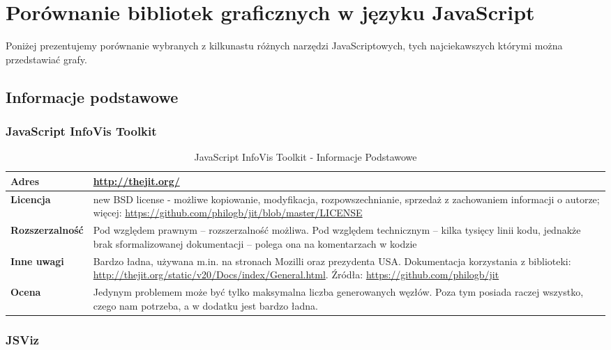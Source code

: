 \chapter{Porównanie bibliotek graficznych w języku JavaScript}
Poniżej prezentujemy porównanie wybranych z kilkunastu różnych narzędzi JavaScriptowych, tych najciekawszych którymi można przedstawiać grafy.

\section{Informacje podstawowe}
\subsection{JavaScript InfoVis Toolkit}

\begin{table}[!htbp]
\begin{tabularx}{\textwidth}{ ||l|R|| }
\hline
\textbf{Adres} & \url{http://thejit.org/} \\
\hline
\textbf{Licencja} & new BSD license - możliwe kopiowanie, modyfikacja, rozpowszechnianie, sprzedaż z zachowaniem informacji o autorze; więcej: \url{https://github.com/philogb/jit/blob/master/LICENSE} \\
\hline

\textbf{Rozszerzalność} & Pod względem prawnym -- rozszerzalność możliwa. Pod względem technicznym -- kilka tysięcy linii kodu, jednakże brak sformalizowanej dokumentacji -- polega ona na komentarzach w kodzie \\
\hline

\textbf{Inne uwagi} & Bardzo ładna, używana m.in. na stronach Mozilli oraz prezydenta USA. Dokumentacja korzystania z biblioteki: \url{http://thejit.org/static/v20/Docs/index/General.html}.
Źródła: \url{https://github.com/philogb/jit} \\
\hline

\textbf{Ocena} & Jedynym problemem może być tylko maksymalna liczba generowanych węzłów. Poza tym posiada raczej wszystko, czego nam potrzeba, a w dodatku jest bardzo ładna. \\
\hline
\end{tabularx}
\caption{JavaScript InfoVis Toolkit - Informacje Podstawowe}
\end{table}


\vfill
\subsection{JSViz}


